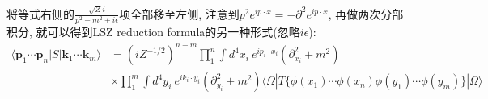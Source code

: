将等式右侧的$\frac{\sqrt{Z}i}{p^2-m^2+i\epsilon}$项全部移至左侧, 注意到$p^2e^{ip\cdot x} = -\partial^2 e^{ip\cdot x}$, 再做两次分部积分, 就可以得到LSZ reduction formula的另一种形式(忽略$i\epsilon$):
\begin{equation}
  \begin{aligned}
    \langle \mathbf{p}_1 \cdots \mathbf{p}_n|S|\mathbf{k}_1 \cdots \mathbf{k}_m \rangle & = (iZ^{-1/2})^{n+m}\prod_1^n \int d^4x_i\ e^{ip_i\cdot x_i}(\partial_{x_i}^2 + m^2)                                                                                    \\
                                                                                        & \times \prod_1^m \int d^4y_i\ e^{ik_i\cdot y_i}(\partial_{y_i}^2 + m^2)\langle \Omega|T\bigl\{\phi(x_1)\cdots \phi(x_n)\phi(y_1)\cdots \phi(y_m)\bigr\}|\Omega \rangle
  \end{aligned}
\end{equation}